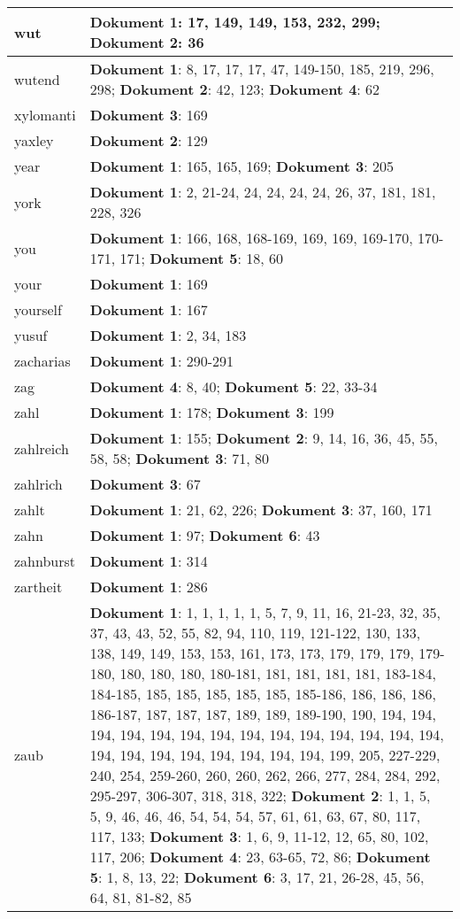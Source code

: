 \documentclass[a5paper]{article}
\begin{document}
\begin{longtable}[l]{|l|p{3in}|}
\hline
wut & \textbf{Dokument 1}: 17, 149, 149, 153, 232, 299; \textbf{Dokument 2}: 36 \\
\hline
wutend & \textbf{Dokument 1}: 8, 17, 17, 17, 47, 149-150, 185, 219, 296, 298; \textbf{Dokument 2}: 42, 123; \textbf{Dokument 4}: 62 \\
\hline
xylomanti & \textbf{Dokument 3}: 169 \\
\hline
yaxley & \textbf{Dokument 2}: 129 \\
\hline
year & \textbf{Dokument 1}: 165, 165, 169; \textbf{Dokument 3}: 205 \\
\hline
york & \textbf{Dokument 1}: 2, 21-24, 24, 24, 24, 24, 26, 37, 181, 181, 228, 326 \\
\hline
you & \textbf{Dokument 1}: 166, 168, 168-169, 169, 169, 169-170, 170-171, 171; \textbf{Dokument 5}: 18, 60 \\
\hline
your & \textbf{Dokument 1}: 169 \\
\hline
yourself & \textbf{Dokument 1}: 167 \\
\hline
yusuf & \textbf{Dokument 1}: 2, 34, 183 \\
\hline
zacharias & \textbf{Dokument 1}: 290-291 \\
\hline
zag & \textbf{Dokument 4}: 8, 40; \textbf{Dokument 5}: 22, 33-34 \\
\hline
zahl & \textbf{Dokument 1}: 178; \textbf{Dokument 3}: 199 \\
\hline
zahlreich & \textbf{Dokument 1}: 155; \textbf{Dokument 2}: 9, 14, 16, 36, 45, 55, 58, 58; \textbf{Dokument 3}: 71, 80 \\
\hline
zahlrich & \textbf{Dokument 3}: 67 \\
\hline
zahlt & \textbf{Dokument 1}: 21, 62, 226; \textbf{Dokument 3}: 37, 160, 171 \\
\hline
zahn & \textbf{Dokument 1}: 97; \textbf{Dokument 6}: 43 \\
\hline
zahnburst & \textbf{Dokument 1}: 314 \\
\hline
zartheit & \textbf{Dokument 1}: 286 \\
\hline
zaub & \textbf{Dokument 1}: 1, 1, 1, 1, 1, 5, 7, 9, 11, 16, 21-23, 32, 35, 37, 43, 43, 52, 55, 82, 94, 110, 119, 121-122, 130, 133, 138, 149, 149, 153, 153, 161, 173, 173, 179, 179, 179, 179-180, 180, 180, 180, 180-181, 181, 181, 181, 181, 183-184, 184-185, 185, 185, 185, 185, 185, 185-186, 186, 186, 186, 186-187, 187, 187, 187, 189, 189, 189-190, 190, 194, 194, 194, 194, 194, 194, 194, 194, 194, 194, 194, 194, 194, 194, 194, 194, 194, 194, 194, 194, 194, 194, 199, 205, 227-229, 240, 254, 259-260, 260, 260, 262, 266, 277, 284, 284, 292, 295-297, 306-307, 318, 318, 322; \textbf{Dokument 2}: 1, 1, 5, 5, 9, 46, 46, 46, 54, 54, 54, 57, 61, 61, 63, 67, 80, 117, 117, 133; \textbf{Dokument 3}: 1, 6, 9, 11-12, 12, 65, 80, 102, 117, 206; \textbf{Dokument 4}: 23, 63-65, 72, 86; \textbf{Dokument 5}: 1, 8, 13, 22; \textbf{Dokument 6}: 3, 17, 21, 26-28, 45, 56, 64, 81, 81-82, 85 \\

\end{longtable}
\end{document}
